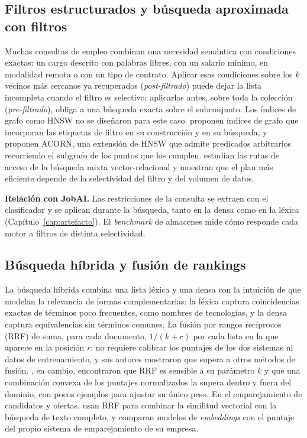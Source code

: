 \subsection{Filtros estructurados y búsqueda aproximada con filtros}

Muchas consultas de empleo combinan una necesidad semántica con condiciones exactas: un cargo descrito con palabras libres, con un salario mínimo, en modalidad remota o con un tipo de contrato. Aplicar esas condiciones sobre los $k$ vecinos más cercanos ya recuperados (\emph{post-filtrado}) puede dejar la lista incompleta cuando el filtro es selectivo; aplicarlas antes, sobre toda la colección (\emph{pre-filtrado}), obliga a una búsqueda exacta sobre el subconjunto. Los índices de grafo como HNSW no se diseñaron para este caso. \citet{Gollapudi2023} proponen índices de grafo que incorporan las etiquetas de filtro en su construcción y en su búsqueda, y \citet{Patel2024} proponen ACORN, una extensión de HNSW que admite predicados arbitrarios recorriendo el subgrafo de los puntos que los cumplen. \citet{Sanca2024} estudian las rutas de acceso de la búsqueda mixta vector-relacional y muestran que el plan más eficiente depende de la selectividad del filtro y del volumen de datos.

\textbf{Relación con JobAI.} Las restricciones de la consulta se extraen con el clasificador y se aplican durante la búsqueda, tanto en la densa como en la léxica (Capítulo~\ref{cap:artefacto}). El \textit{benchmark} de almacenes mide cómo responde cada motor a filtros de distinta selectividad.

\subsection{Búsqueda híbrida y fusión de rankings}

La búsqueda híbrida combina una lista léxica y una densa con la intuición de que modelan la relevancia de formas complementarias: la léxica captura coincidencias exactas de términos poco frecuentes, como nombres de tecnologías, y la densa captura equivalencias sin términos comunes. La fusión por rangos recíprocos (RRF) de \citet{Cormack2009} suma, para cada documento, $1/(k + r)$ por cada lista en la que aparece en la posición $r$; no requiere calibrar los puntajes de los dos sistemas ni datos de entrenamiento, y sus autores mostraron que supera a otros métodos de fusión. \citet{Bruch2023}, en cambio, encontraron que RRF es sensible a su parámetro $k$ y que una combinación convexa de los puntajes normalizados la supera dentro y fuera del dominio, con pocos ejemplos para ajustar su único peso. En el emparejamiento de candidatos y ofertas, \citet{Yashwant2026} usan RRF para combinar la similitud vectorial con la búsqueda de texto completo, y comparan modelos de \textit{embeddings} con el puntaje del propio sistema de emparejamiento de su empresa.


